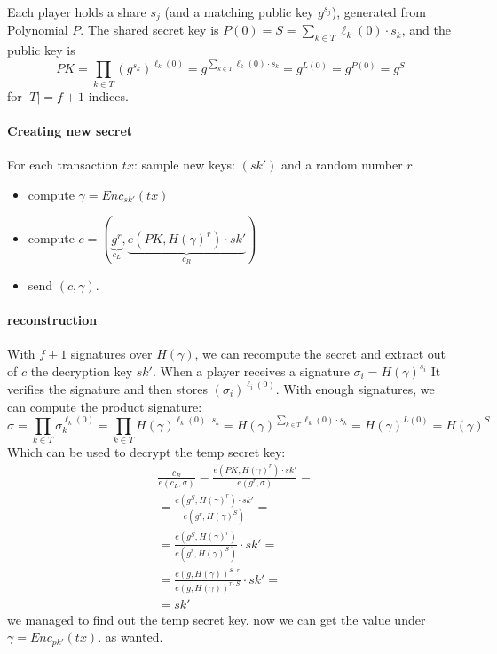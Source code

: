 Each player holds a share $s_j$ (and a matching public key $g^{s_j}$), generated from Polynomial $P$. 
The shared secret key is $P(0)= S = \sum_{k \in T}{\ell_k(0)\cdot s_k}$,
and the public key is 
$$
  PK=
  \prod_{k\in T}{(g^{s_k})^{\ell_k(0)}} =
  g^{\sum_{k\in T}{\ell_k(0)\cdot s_k}} =
  g^{L(0)}=g^{P(0)}=g^S 
$$
for $|T|=f+1$ indices.

\paragraph*{Creating new secret}
For each transaction $tx$: sample new keys: $\left(sk'\right)$ and a random number $r$.
\begin{itemize}
\item compute $\gamma=Enc_{sk'}\left(tx\right)$
\item compute $c=\left(\underbrace{g^{r}}_{c_{L}},\underbrace{e\left(PK, H\left(\gamma\right)^{r}\right)\cdot sk'}_{c_{R}}\right)$ 
\item send $\left(c, \gamma\right)$.
\end{itemize}



\paragraph*{reconstruction}


With $f+1$ signatures over $H(\gamma)$, we can recompute the secret and extract out of $c$ the decryption key $sk'$.
When a player receives a signature $\sigma_{i}=H\left(\gamma\right)^{s_{i}}$
It verifies the signature and then stores $ (\sigma_i)^{\ell_i(0)}$.
With enough signatures, we can compute the product signature: $$
\sigma=\prod_{k\in T}{\sigma_k^{\ell_k(0)}} = 
\prod_{k\in T}{H\left(\gamma\right)^{\ell_k(0)\cdot s_{k}}} = 
H\left(\gamma\right)^{\sum_{k\in T}{\ell_k(0)\cdot s_{k}}}=
H\left(\gamma\right)^{L(0)} =
H\left(\gamma\right)^{S}
$$
Which can be used to decrypt the temp secret key: 
\begin{align*}
 & \frac{c_{R}}{e\left(c_{L},\sigma\right)}=\frac{e\left(PK, H\left(\gamma\right)^{r}\right)\cdot sk'}{e\left(g^{r},\sigma\right)}=\\
 & =\frac{e\left(g^S, H\left(\gamma\right)^{r}\right)\cdot sk'}{e\left(g^{r},H(\gamma)^S\right)}=\\
 & =\frac{e\left(g^S, H\left(\gamma\right)^{r}\right)}{e\left(g^{r},H(\gamma)^S\right)} \cdot sk'=\\
 & =\frac{e\left(g, H\left(\gamma\right)\right)^{S\cdot r}}{e\left(g,H(\gamma)\right)^{r\cdot S}} \cdot sk'=\\
 & =sk'
\end{align*}
 we managed to find out the temp secret key. now we can get the value
under $\gamma=Enc_{pk'}\left(tx\right)$. as wanted.


